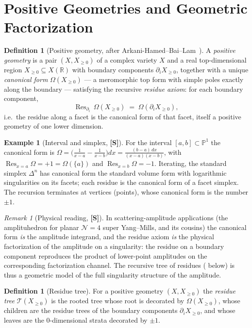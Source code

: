 \documentclass[12pt]{article}
\theoremstyle{definition}
\newtheorem{definition}[theorem]{Definition}
\newtheorem{example}[theorem]{Example}
\theoremstyle{remark}
\newtheorem{remark}[theorem]{Remark}
\newcommand{\Res}{\operatorname{Res}}
\newcommand{\RR}{\mathbb{R}}
\newcommand{\PP}{\mathbb{P}}
\newcommand{\status}[1]{\textnormal{\textsf{\textbf{[#1]}}}}
\begin{document}
\section{Positive Geometries and Geometric Factorization}
\label{sec:posgeom}

\begin{definition}[Positive geometry, after Arkani-Hamed--Bai--Lam~\cite{abl}]
\label{def:posgeom}
A \emph{positive geometry} is a pair $(X,X_{\ge 0})$ of a complex variety $X$ and a real
top-dimensional region $X_{\ge 0}\subseteq X(\RR)$ with boundary components $\partial_i X_{\ge 0}$,
together with a unique \emph{canonical form} $\Omega(X_{\ge 0})$ --- a meromorphic top form with simple
poles exactly along the boundary --- satisfying the recursive \emph{residue axiom}: for each boundary
component,
\[
  \Res_{\partial_i}\,\Omega(X_{\ge 0}) \;=\; \Omega(\partial_i X_{\ge 0}),
\]
i.e.\ the residue along a facet is the canonical form of that facet, itself a positive geometry of one
lower dimension.
\end{definition}

\begin{example}[Interval and simplex, \status{S}]
For the interval $[a,b]\subset\PP^1$ the canonical form is
$\Omega = \bigl(\frac{1}{x-a}-\frac{1}{x-b}\bigr)dx = \frac{(b-a)\,dx}{(x-a)(x-b)}$, with
$\Res_{x=a}\Omega = +1 = \Omega(\{a\})$ and $\Res_{x=b}\Omega = -1$. Iterating, the standard simplex
$\Delta^n$ has canonical form the standard volume form with logarithmic singularities on its facets;
each residue is the canonical form of a facet simplex. The recursion terminates at vertices (points),
whose canonical form is the number $\pm 1$.
\end{example}

\begin{remark}[Physical reading, \status{S}]
In scattering-amplitude applications (the amplituhedron for planar $\mathcal N=4$ super Yang--Mills,
and its cousins) the canonical form \emph{is} the amplitude integrand, and the residue axiom
\emph{is} the physical factorization of the amplitude on a singularity: the residue on a boundary
component reproduces the product of lower-point amplitudes on the corresponding factorization channel.
The recursive tree of residues ( below) is thus a geometric model of the full
singularity structure of the amplitude.
\end{remark}

\begin{definition}[Residue tree]
\label{def:restree}
For a positive geometry $(X,X_{\ge 0})$ the \emph{residue tree} $\mathcal T(X_{\ge 0})$ is the rooted
tree whose root is decorated by $\Omega(X_{\ge 0})$, whose children are the residue trees of the
boundary components $\partial_i X_{\ge 0}$, and whose leaves are the $0$-dimensional strata decorated
by $\pm 1$.
\end{definition}
\end{document}
